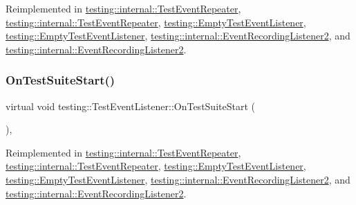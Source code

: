 Reimplemented in \mbox{\hyperlink{classtesting_1_1internal_1_1_test_event_repeater_a59e442d1f79ea186499ef99284a60d4c}{testing\+::internal\+::\+Test\+Event\+Repeater}}, \mbox{\hyperlink{classtesting_1_1internal_1_1_test_event_repeater_a59e442d1f79ea186499ef99284a60d4c}{testing\+::internal\+::\+Test\+Event\+Repeater}}, \mbox{\hyperlink{classtesting_1_1_empty_test_event_listener_aefdb73682d290791461e186d864db718}{testing\+::\+Empty\+Test\+Event\+Listener}}, \mbox{\hyperlink{classtesting_1_1_empty_test_event_listener_aefdb73682d290791461e186d864db718}{testing\+::\+Empty\+Test\+Event\+Listener}}, \mbox{\hyperlink{classtesting_1_1internal_1_1_event_recording_listener2_aefd67a80de94cdd8e2e43c0fad812bd2}{testing\+::internal\+::\+Event\+Recording\+Listener2}}, and \mbox{\hyperlink{classtesting_1_1internal_1_1_event_recording_listener2_aefd67a80de94cdd8e2e43c0fad812bd2}{testing\+::internal\+::\+Event\+Recording\+Listener2}}.

\mbox{\label{classtesting_1_1_test_event_listener_a2726cc70dfda861f109355f1d9f09dfe}} 
\subsubsection{\texorpdfstring{OnTestSuiteStart()}{OnTestSuiteStart()}\hspace{0.1cm}{\footnotesize\ttfamily [1/2]}}
{\footnotesize\ttfamily virtual void testing\+::\+Test\+Event\+Listener\+::\+On\+Test\+Suite\+Start (\begin{DoxyParamCaption}\item[{const \mbox{\hyperlink{classtesting_1_1_test_suite}{Test\+Suite}} \&}]{ }\end{DoxyParamCaption})\hspace{0.3cm}{\ttfamily [inline]}, {\ttfamily [virtual]}}



Reimplemented in \mbox{\hyperlink{classtesting_1_1internal_1_1_test_event_repeater_aa54fdafe6dfdd46dbac108c17016a5f9}{testing\+::internal\+::\+Test\+Event\+Repeater}}, \mbox{\hyperlink{classtesting_1_1internal_1_1_test_event_repeater_aa54fdafe6dfdd46dbac108c17016a5f9}{testing\+::internal\+::\+Test\+Event\+Repeater}}, \mbox{\hyperlink{classtesting_1_1_empty_test_event_listener_a1e32e4bd4857822b6b50e6900aa5c651}{testing\+::\+Empty\+Test\+Event\+Listener}}, \mbox{\hyperlink{classtesting_1_1_empty_test_event_listener_a1e32e4bd4857822b6b50e6900aa5c651}{testing\+::\+Empty\+Test\+Event\+Listener}}, \mbox{\hyperlink{classtesting_1_1internal_1_1_event_recording_listener2_a6bc3ac71f7f96e9c62b0c7dffd5f66b0}{testing\+::internal\+::\+Event\+Recording\+Listener2}}, and \mbox{\hyperlink{classtesting_1_1internal_1_1_event_recording_listener2_a6bc3ac71f7f96e9c62b0c7dffd5f66b0}{testing\+::internal\+::\+Event\+Recording\+Listener2}}.

